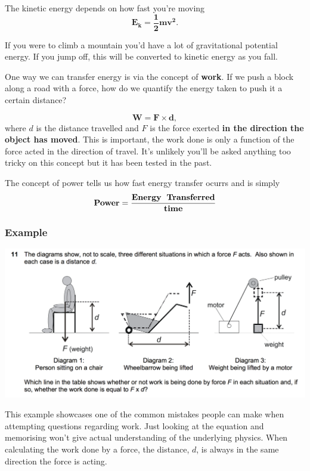 \documentclass[11pt, titlepage]{article}
\begin{document}
The kinetic energy depends on how fast you're moving
\begin{equation*}
\mathbf{E_k=\frac{1}{2}mv^2}.
\end{equation*}

If you were to climb a mountain you'd have a lot of gravitational potential energy.  If you jump off, this will be converted to kinetic energy as you fall.

One way we can transfer energy is via the concept of \textbf{work}.  If we push a block along a road with a force, how do we quantify the energy taken to push it a certain distance?

\begin{equation*}
\mathbf{W=F\times d},
\end{equation*}
where $d$ is the distance travelled and $F$ is the force exerted \textbf{in the direction the object has moved}.  This is important, the work done is only a function of the force acted in the direction of travel.  It's unlikely you'll be asked anything too tricky on this concept but it has been tested in the past.

The concept of power tells us how fast energy transfer ocurrs and is simply
\begin{equation*}
\mathbf{\rm{\textbf{Power}}=\frac{\rm{\textbf{Energy\: Transferred}}}{\rm{\textbf{time}}}}
\end{equation*}

\subsubsection*{Example}
\includegraphics[width=\textwidth]{2012q11}

This example showcases one of the common mistakes people can make when attempting questions regarding work.  Just looking at the equation and memorising won't give actual understanding of the underlying physics.  When calculating the work done by a force, the distance, $d$, is always in the same direction the force is acting.  
\end{document}
